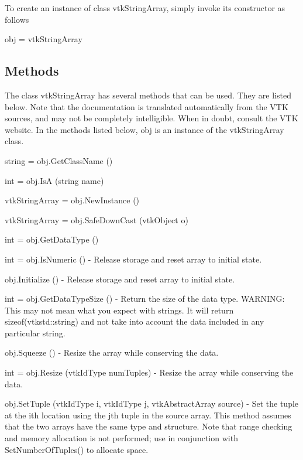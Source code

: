 To create an instance of class vtk\-String\-Array, simply invoke its constructor as follows \begin{DoxyVerb}  obj = vtkStringArray
\end{DoxyVerb}
 \hypertarget{vtkwidgets_vtkxyplotwidget_Methods}{}\subsection{Methods}\label{vtkwidgets_vtkxyplotwidget_Methods}
The class vtk\-String\-Array has several methods that can be used. They are listed below. Note that the documentation is translated automatically from the V\-T\-K sources, and may not be completely intelligible. When in doubt, consult the V\-T\-K website. In the methods listed below, {\ttfamily obj} is an instance of the vtk\-String\-Array class. 
\begin{DoxyItemize}
\item {\ttfamily string = obj.\-Get\-Class\-Name ()}  
\item {\ttfamily int = obj.\-Is\-A (string name)}  
\item {\ttfamily vtk\-String\-Array = obj.\-New\-Instance ()}  
\item {\ttfamily vtk\-String\-Array = obj.\-Safe\-Down\-Cast (vtk\-Object o)}  
\item {\ttfamily int = obj.\-Get\-Data\-Type ()}  
\item {\ttfamily int = obj.\-Is\-Numeric ()} -\/ Release storage and reset array to initial state.  
\item {\ttfamily obj.\-Initialize ()} -\/ Release storage and reset array to initial state.  
\item {\ttfamily int = obj.\-Get\-Data\-Type\-Size ()} -\/ Return the size of the data type. W\-A\-R\-N\-I\-N\-G\-: This may not mean what you expect with strings. It will return sizeof(vtkstd\-::string) and not take into account the data included in any particular string.  
\item {\ttfamily obj.\-Squeeze ()} -\/ Resize the array while conserving the data.  
\item {\ttfamily int = obj.\-Resize (vtk\-Id\-Type num\-Tuples)} -\/ Resize the array while conserving the data.  
\item {\ttfamily obj.\-Set\-Tuple (vtk\-Id\-Type i, vtk\-Id\-Type j, vtk\-Abstract\-Array source)} -\/ Set the tuple at the ith location using the jth tuple in the source array. This method assumes that the two arrays have the same type and structure. Note that range checking and memory allocation is not performed; use in conjunction with Set\-Number\-Of\-Tuples() to allocate space.  

\end{DoxyItemize}
